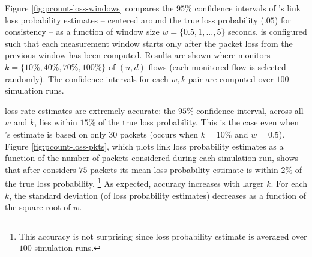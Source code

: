 Figure \ref{fig:pcount-loss-windows} compares the $95\%$ confidence intervals of \pcnts's link loss probability estimates -- centered around the true loss probability ($.05$) for consistency -- 
as a function of window size $w =\{0.5,1,...,5\}$ seconds. \pcnt is configured such that each measurement window starts only after the packet loss from the previous window has been computed.
Results are shown where \pcnt monitors $k=\{10\%,40\%,70\%,100\%\}$ of $(u,d)$ flows (each monitored flow is selected randomly).  The confidence intervals for each $w,k$ pair are computed
over $100$ simulation runs.


\pcnt loss rate estimates are extremely accurate: the $95\%$ confidence interval, across all $w$ and $k$, lies within $15\%$ of the true loss probability.  This is the case even when \pcnts's 
estimate is based on only $30$ packets (occurs when $k=10\%$ and $w=0.5$).  Figure \ref{fig:pcount-loss-pkts}, which plots link loss probability estimates as a function of the number of 
packets considered during each simulation run, shows that after \pcnt considers $75$ packets its mean loss probability estimate is within $2\%$ of the true loss probability.  
\footnote{This accuracy is not surprising since loss probability estimate is averaged over $100$ simulation runs.}
As expected, \pcnt accuracy increases with larger $k$.  For each $k$, the standard deviation (of \pcnt loss probability estimates) decreases as a function of the square root of $w$.  





